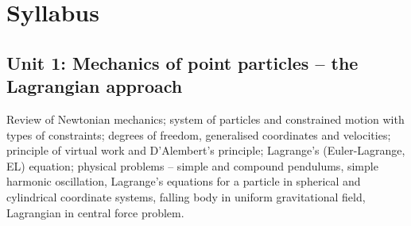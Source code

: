 \section*{Syllabus}

\subsection*{Unit 1: Mechanics of point particles -- the Lagrangian approach}
Review of Newtonian mechanics; system of particles and constrained motion with types of constraints; degrees of freedom, generalised coordinates and velocities; principle of virtual work and D'Alembert's principle; Lagrange's (Euler-Lagrange, EL) equation; physical problems -- simple and compound pendulums, simple harmonic oscillation, Lagrange's equations for a particle in spherical and cylindrical coordinate systems, falling body in uniform gravitational field, Lagrangian in central force problem.